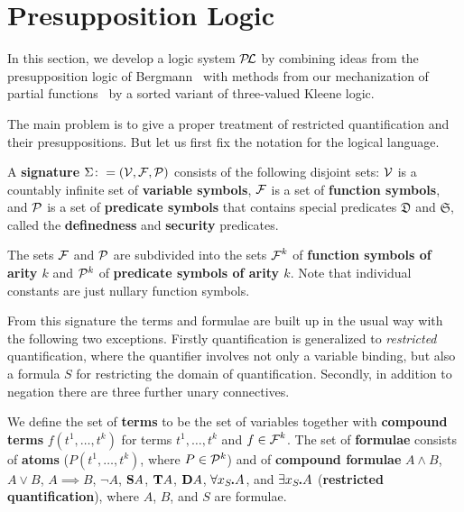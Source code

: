 \documentclass{\filespath jancl}
\def\Vars{{\cV}}                      %
\def\Funcs{{\mbox{$\cF$}}}
\def\cV{{\cal V}}\def\cW{{\cal W}}\def\cX{{\cal X}}
\def\sdot{\rule{.3ex}{.3ex}\hspace{-0.4ex}\;}
\newcommand{\Defined}{{\mathfrak D}}
\newcommand{\Secure}{{\mathfrak S}}
\def\presuppl{{\cal P\kern-.4ex L}}
\def\Preds{{\cal P}}
\def\tf{{\bf D}}
\def\holds{{\bf T}}
\def\deft{{\bf S}}
\begin{document}
\section{Presupposition Logic}
\label{sec:presuppl}

In this section, we develop a logic system $\presuppl$ by combining ideas from the
presupposition logic of Bergmann~\cite{Bergmann:patdl81} with methods from our
mechanization of partial functions~\cite{KeKo94} by a sorted variant of three-valued
Kleene logic.

The main problem is to give a proper treatment of restricted
quantification and their presuppositions. But let us first fix the notation
for the logical language. 

\begin{definition}[Signature]
  A {\bf signature} $\Sigma\colon=(\Vars,\Funcs,\Preds)$ consists of the
  following disjoint sets: $\Vars$ is a countably infinite set of {\bf
    variable symbols}, $\Funcs$ is a set of {\bf function symbols}, and
  $\Preds$ is a set of {\bf predicate symbols} that contains special predicates
  $\Defined$ and $\Secure$, called the {\bf definedness} and {\bf security}
  predicates.
  
  The sets $\Funcs$ and $\Preds$ are subdivided into the sets $\Funcs^k$ of
  {\bf function symbols of arity $k$} and $\Preds^k$ of {\bf predicate symbols
    of arity $k$}. Note that individual constants are just nullary function 
   symbols.
\end{definition}

{}From this signature the terms and formulae are built up in the
usual way with the following two exceptions. Firstly quantification is
generalized to {\em restricted\/} quantification, where the quantifier involves
not only a variable binding, but also a formula $S$ for restricting the domain
of quantification. Secondly, in addition to negation there are three further unary connectives.

\begin{definition}
  We define the set of {\bf terms} to be the set of variables together
  with {\bf compound terms} $f(t^1,\ldots,t^k)$ for terms
  $t^1,\ldots,t^k$ and $f\in\Funcs^k$. The set of\/ {\bf formulae}
  consists of\/ {\bf atoms} ($P(t^1,\ldots,t^k)$, where
  $P\in\Preds^k$) and of\/ {\bf compound formulae} $A\land B$, $A\lor
  B$, $A\implies B$, $\lnot A$, $\deft A$, $\holds A$, $\tf A$,
  $\forall x_S\sdot A$, and $\exists x_S\sdot A$ ({\bf restricted
    quantification}), where $A$, $B$, and $S$ are formulae.
\end{definition}
\end{document}
